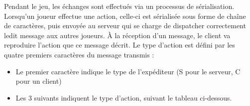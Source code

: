 \documentclass[12pt]{report}
\begin{document}
Pendant le jeu, les échanges sont effectués via un processus de sérialisation.
Lorsqu’un joueur effectue une action, celle-ci est sérialisée sous forme de
chaîne de caractères, puis envoyée au serveur qui se charge de dispatcher
correctement ledit message aux autres joueurs. À la réception d’un message, le
client va reproduire l’action que ce message décrit. Le type d’action est défini
par les quatre premiers caractères du message transmis : 

\begin{itemize}
    \item Le premier caractère indique le type de l’expéditeur (S pour le
        serveur, C pour un client) 
    \item Les 3 suivants indiquent le type d’action, suivant le tableau
        ci-dessous.
\end{itemize}
\end{document}
